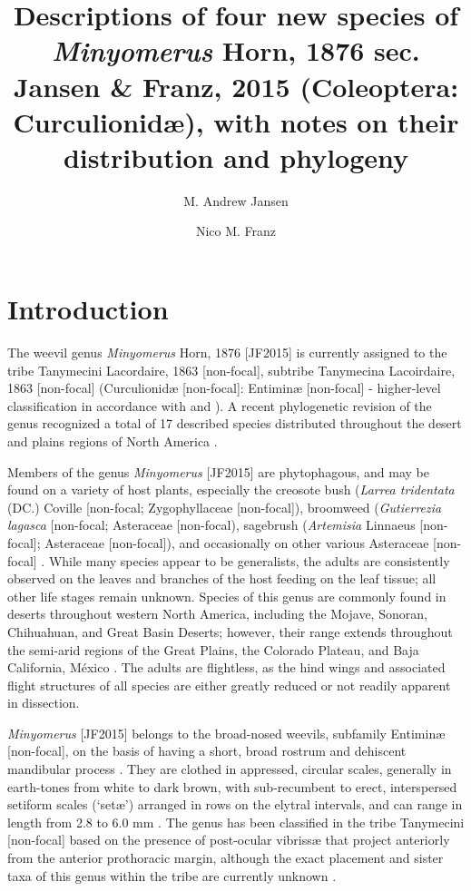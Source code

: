 \documentclass[fleqn,10pt,lineno]{wlpeerj} %
\title{Descriptions of four new species of \textit{Minyomerus} Horn, 1876 sec. Jansen \& Franz, 2015 (Coleoptera: Curculionid{\ae}), with notes on their distribution and phylogeny}
\author[1]{M. Andrew Jansen}
\author[2]{Nico M. Franz}
\affil[1]{School of Life Sciences, 427 E Tyler Mall, PO Box 874501, Tempe, AZ 85287}
\affil[2]{ASU Natural History Collections, 734 W Alameda Dr, Tempe, AZ 85282}
\begin{document}
\flushbottom
\maketitle
\thispagestyle{empty}

\section*{Introduction}
	The weevil genus \textit{Minyomerus} Horn, 1876 [JF2015] is currently assigned to the tribe Tanymecini Lacordaire, 1863 [non-focal], subtribe Tanymecina Lacoirdaire, 1863 [non-focal] (Curculionid{\ae} [non-focal]: Entimin{\ae} [non-focal] - higher-level classification in accordance with \citealt{alonso1999} and \citealt{bouchard2011}). 
	A recent phylogenetic revision of the genus recognized a total of 17 described species distributed throughout the desert and plains regions of North America \citep{jansen2015}.
	
	Members of the genus \textit{Minyomerus} [JF2015] are phytophagous, and may be found on a variety of host plants, especially the creosote bush (\textit{Larrea tridentata} (DC.) Coville [non-focal; Zygophyllaceae [non-focal]), broomweed (\textit{Gutierrezia lagasca} [non-focal; Asteraceae [non-focal), sagebrush (\textit{Artemisia} Linnaeus [non-focal]; Asteraceae [non-focal]), and occasionally on other various Asteraceae [non-focal] \citep{jansen2015}. 
	While many species appear to be generalists, the adults are consistently observed on the leaves and branches of the host feeding on the leaf tissue; all other life stages remain unknown.
	Species of this genus are commonly found in deserts throughout western North America, including the Mojave, Sonoran, Chihuahuan, and Great Basin Deserts; however, their range extends throughout the semi-arid regions of the Great Plains, the Colorado Plateau, and Baja California, M\'{e}xico \citep{obrien1982, jansen2015}. 
	The adults are flightless, as the hind wings and associated flight structures of all species are either greatly reduced or not readily apparent in dissection.
		
	\textit{Minyomerus} [JF2015] belongs to the broad-nosed weevils, subfamily Entimin{\ae} [non-focal], on the basis of having a short, broad rostrum and dehiscent mandibular process \citep{marvaldi1997, anderson2002, oberprieler2007, oberprieler2014, marvaldi2014}.
	They are clothed in appressed, circular scales, generally in earth-tones from white to dark brown, with sub-recumbent to erect, interspersed setiform scales (`set{\ae}') arranged in rows on the elytral intervals, and can range in length from 2.8 to 6.0 mm \citep{jansen2015}.
	The genus has been classified in the tribe Tanymecini [non-focal] based on the presence of post-ocular vibriss{\ae} that project anteriorly from the anterior prothoracic margin, although the exact placement and sister taxa of this genus within the tribe are currently unknown \citep{howden1959, howden1970, howden1982, jansen2015}.
		
\end{document}
